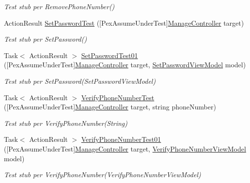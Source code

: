 \begin{DoxyCompactItemize}
\begin{DoxyCompactList}\small\item\em Test stub per Remove\+Phone\+Number()\end{DoxyCompactList}\item 
Action\+Result \mbox{\hyperlink{class_brew_day2_1_1_controllers_1_1_tests_1_1_manage_controller_test_a9e6f097c2521f513a601aa930aef845e}{Set\+Password\+Test}} (\mbox{[}Pex\+Assume\+Under\+Test\mbox{]}\mbox{\hyperlink{class_brew_day2_1_1_controllers_1_1_manage_controller}{Manage\+Controller}} target)
\begin{DoxyCompactList}\small\item\em Test stub per Set\+Password()\end{DoxyCompactList}\item 
Task$<$ Action\+Result $>$ \mbox{\hyperlink{class_brew_day2_1_1_controllers_1_1_tests_1_1_manage_controller_test_a651bdb6398d304c324781db05bfbb1fc}{Set\+Password\+Test01}} (\mbox{[}Pex\+Assume\+Under\+Test\mbox{]}\mbox{\hyperlink{class_brew_day2_1_1_controllers_1_1_manage_controller}{Manage\+Controller}} target, \mbox{\hyperlink{class_brew_day2_1_1_models_1_1_set_password_view_model}{Set\+Password\+View\+Model}} model)
\begin{DoxyCompactList}\small\item\em Test stub per Set\+Password(\+Set\+Password\+View\+Model)\end{DoxyCompactList}\item 
Task$<$ Action\+Result $>$ \mbox{\hyperlink{class_brew_day2_1_1_controllers_1_1_tests_1_1_manage_controller_test_a46d3acd921b6a3c63f4176e407128c14}{Verify\+Phone\+Number\+Test}} (\mbox{[}Pex\+Assume\+Under\+Test\mbox{]}\mbox{\hyperlink{class_brew_day2_1_1_controllers_1_1_manage_controller}{Manage\+Controller}} target, string phone\+Number)
\begin{DoxyCompactList}\small\item\em Test stub per Verify\+Phone\+Number(\+String)\end{DoxyCompactList}\item 
Task$<$ Action\+Result $>$ \mbox{\hyperlink{class_brew_day2_1_1_controllers_1_1_tests_1_1_manage_controller_test_ac9fe3b71e7afd9e5ec353f72f910e9a2}{Verify\+Phone\+Number\+Test01}} (\mbox{[}Pex\+Assume\+Under\+Test\mbox{]}\mbox{\hyperlink{class_brew_day2_1_1_controllers_1_1_manage_controller}{Manage\+Controller}} target, \mbox{\hyperlink{class_brew_day2_1_1_models_1_1_verify_phone_number_view_model}{Verify\+Phone\+Number\+View\+Model}} model)
\begin{DoxyCompactList}\small\item\em Test stub per Verify\+Phone\+Number(\+Verify\+Phone\+Number\+View\+Model)\end{DoxyCompactList}\item 

\end{DoxyCompactItemize}
